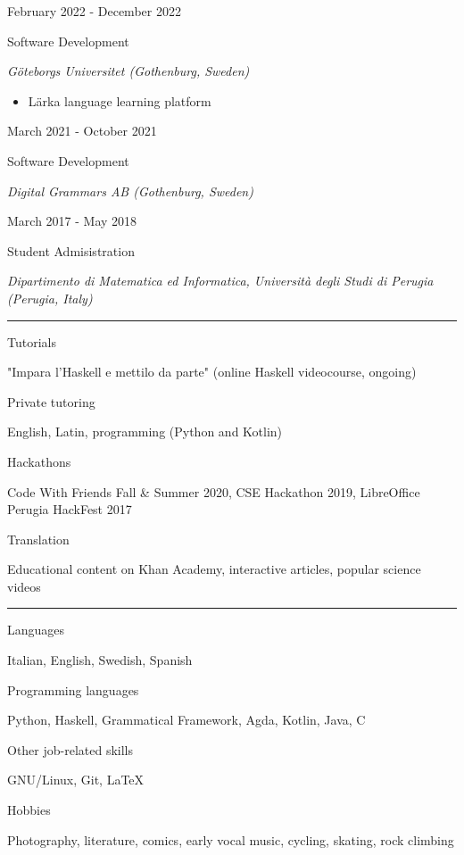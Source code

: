 \documentclass[a4paper,10pt]{article}
\newlength{\cvcolumngapwidth}
\newlength{\cvleftcolumnwidth}
\newlength{\cvrightcolumnwidth}
\newcommand{\cvsectionstyle}[1]{{\normalsize\cvsectionfont\textcolor{cvsectioncolor}{#1}}}
\newcommand{\cvtitlestyle}[1]{{\large\cvtitlefont\textcolor{cvtitlecolor}{#1}}}
\newcommand{\cvdurationstyle}[1]{{\small\cvdurationfont\textcolor{cvdurationcolor}{#1}}}
\newcommand{\cvheadingstyle}[1]{{\normalsize\cvheadingfont\textcolor{cvheadingcolor}{#1}}}
\newlength{\cvafteritemskipamount}
\newlength{\cvaftersectionskipamount}
\newlength{\cvbetweensectionandheadingextraskipamount}
\newlength{\cvaftertitleskipamount}
\newlength{\cvparskip}
\newcommand{\cvsection}[1]{
    \begin{minipage}[t]{\cvleftcolumnwidth}
        \raggedleft\cvsectionstyle{#1}
    \end{minipage}%
    \hspace{\cvcolumngapwidth}%
    \begin{minipage}[t]{\cvrightcolumnwidth}
        \textcolor{cvrulecolor}{\rule{\cvrightcolumnwidth}{0.3mm}}
    \end{minipage}

    \vspace{\cvaftersectionskipamount}
}
\newcommand{\cvitem}[2]{
    \begin{minipage}[t]{\cvleftcolumnwidth}
        \raggedleft #1
    \end{minipage}%
    \hspace{\cvcolumngapwidth}%
    \begin{minipage}[t]{\cvrightcolumnwidth}
        \setlength{\parskip}{\cvparskip} #2
    \end{minipage}

    \vspace{\cvafteritemskipamount}
}
\newcommand{\cvtitle}[1]{
    \cvtitlestyle{#1}

    \vspace{\cvaftertitleskipamount}
    \vspace{-\cvparskip}
}
\begin{document}
\cvitem{
    \cvdurationstyle{February 2022 - December 2022}
}{
    \cvtitle{Software Development}
    \textit{Göteborgs Universitet (Gothenburg, Sweden)}
    \begin{itemize}[leftmargin=*]
    \item Lärka language learning platform
    \end{itemize}
}

\cvitem{
    \cvdurationstyle{March 2021 - October 2021}
}{
    \cvtitle{Software Development}

    \textit{Digital Grammars AB (Gothenburg, Sweden)}
}

\cvitem{
    \cvdurationstyle{March 2017 - May 2018}
}{
    \cvtitle{Student Admisistration}

    \textit{Dipartimento di Matematica ed Informatica, Università degli Studi di Perugia (Perugia, Italy)}
    
}

%


\cvsection{OTHER EXPERIENCE}

\vspace{\cvbetweensectionandheadingextraskipamount}

\cvitem{
    \cvheadingstyle{Tutorials}
}{
    "Impara l'Haskell e mettilo da parte" (online Haskell videocourse, ongoing)
}

\cvitem{
    \cvheadingstyle{Private tutoring}
}{
    English, Latin, programming (Python and Kotlin)
}

\cvitem{
    \cvheadingstyle{Hackathons}
}{
    Code With Friends Fall \& Summer 2020, CSE Hackathon 2019, LibreOffice Perugia HackFest 2017 
}

\cvitem{
    \cvheadingstyle{Translation}
}{
    Educational content on Khan Academy, interactive articles, popular science videos
}


\cvsection{SKILLS AND INTERESTS}

\vspace{\cvbetweensectionandheadingextraskipamount}

\cvitem{
    \cvheadingstyle{Languages}
}{
    Italian, English, Swedish, Spanish
}

\cvitem{
    \cvheadingstyle{Programming languages}
}{
    Python, Haskell, Grammatical Framework, Agda, Kotlin, Java, C
}

\cvitem{
    \cvheadingstyle{Other job-related skills}
}{
    GNU/Linux, Git, LaTeX
}

\cvitem{
    \cvheadingstyle{Hobbies}
}{
    Photography, literature, comics, early vocal music, cycling, skating, rock climbing 
}
\end{document}

